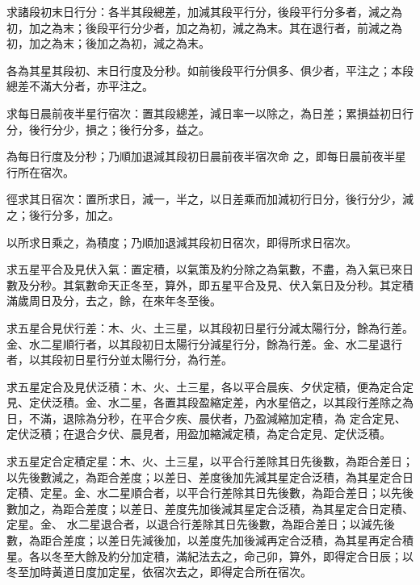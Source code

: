 \begin{pinyinscope}
 求諸段初末日行分：各半其段總差，加減其段平行分，後段平行分多者，減之為初，加之為末；後段平行分少者，加之為初，減之為末。其在退行者，前減之為初，加之為末；後加之為初，減之為末。



 各為其星其段初、末日行度及分秒。如前後段平行分俱多、俱少者，平注之；本段總差不滿大分者，亦平注之。



 求每日晨前夜半星行宿次：置其段總差，減日率一以除之，為日差；累損益初日行分，後行分少，損之；後行分多，益之。



 為每日行度及分秒；乃順加退減其段初日晨前夜半宿次命
 之，即每日晨前夜半星行所在宿次。



 徑求其日宿次：置所求日，減一，半之，以日差乘而加減初行日分，後行分少，減之；後行分多，加之。



 以所求日乘之，為積度；乃順加退減其段初日宿次，即得所求日宿次。



 求五星平合及見伏入氣：置定積，以氣策及約分除之為氣數，不盡，為入氣已來日數及分秒。其氣數命天正冬至，算外，即五星平合及見、伏入氣日及分秒。其定積滿歲周日及分，去之，餘，在來年冬至後。



 求五星合見伏行差：木、火、土三星，以其段初日星行分減太陽行分，餘為行差。金、水二星順行者，以其段初日太陽行分減星行分，餘為行差。金、水二星退行者，以其段初日星行分並太陽行分，為行差。



 求五星定合及見伏泛積：木、火、土三星，各以平合晨疾、夕伏定積，便為定合定見、定伏泛積。金、水二星，各置其段盈縮定差，內水星倍之，以其段行差除之為日，不滿，退除為分秒，在平合夕疾、晨伏者，乃盈減縮加定積，為
 定合定見、定伏泛積；在退合夕伏、晨見者，用盈加縮減定積，為定合定見、定伏泛積。



 求五星定合定積定星：木、火、土三星，以平合行差除其日先後數，為距合差日；以先後數減之，為距合差度；以差日、差度後加先減其星定合泛積，為其星定合日定積、定星。金、水二星順合者，以平合行差除其日先後數，為距合差日；以先後數加之，為距合差度；以差日、差度先加後減其星定合泛積，為其星定合日定積、定星。金、
 水二星退合者，以退合行差除其日先後數，為距合差日；以減先後數，為距合差度；以差日先減後加，以差度先加後減再定合泛積，為其星再定合積星。各以冬至大餘及約分加定積，滿紀法去之，命己卯，算外，即得定合日辰；以冬至加時黃道日度加定星，依宿次去之，即得定合所在宿次。




\end{pinyinscope}
